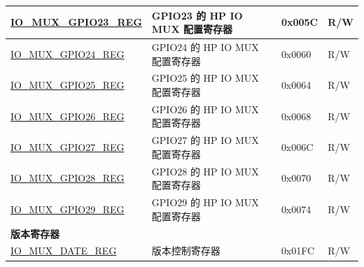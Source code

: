 \begin{longtable}{ | p{6cm} | p{7.2cm} | p{1.3cm} | p{1cm} | }
\hyperref[regdesc:IOMUXGPIONREG]{IO\_MUX\_GPIO23\_REG} & GPIO23 的 HP IO MUX 配置寄存器  & 0x005C & R/W \\ \hline
\hyperref[regdesc:IOMUXGPIONREG]{IO\_MUX\_GPIO24\_REG} & GPIO24 的 HP IO MUX 配置寄存器  & 0x0060 & R/W \\ \hline
\hyperref[regdesc:IOMUXGPIONREG]{IO\_MUX\_GPIO25\_REG} & GPIO25 的 HP IO MUX 配置寄存器  & 0x0064 & R/W \\ \hline
\hyperref[regdesc:IOMUXGPIONREG]{IO\_MUX\_GPIO26\_REG} & GPIO26 的 HP IO MUX 配置寄存器  & 0x0068 & R/W \\ \hline
\hyperref[regdesc:IOMUXGPIONREG]{IO\_MUX\_GPIO27\_REG} & GPIO27 的 HP IO MUX 配置寄存器  & 0x006C & R/W \\ \hline
\hyperref[regdesc:IOMUXGPIONREG]{IO\_MUX\_GPIO28\_REG} & GPIO28 的 HP IO MUX 配置寄存器  & 0x0070 & R/W \\ \hline
\hyperref[regdesc:IOMUXGPIONREG]{IO\_MUX\_GPIO29\_REG} & GPIO29 的 HP IO MUX 配置寄存器  & 0x0074 & R/W \\ \hline
\multicolumn{4}{|l|}{\textbf{版本寄存器}} \\ \hline
\hyperref[regdesc:IOMUXDATEREG]{IO\_MUX\_DATE\_REG} & 版本控制寄存器 & 0x01FC & R/W \\ \hline
\end{longtable}
